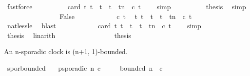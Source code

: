 \begin{isabellebody}
\ fastforce\isanewline
\ \ \ \ \ \ \ \ \isamarkupfalse%
\ {\isacartoucheopen}card\ {\isacharbraceleft}t{\isacharprime}{\isachardot}\ t\ {\isasymle}\ t{\isacharprime}\ {\isasymand}\ t{\isacharprime}\ {\isasymle}\ t{\isacharplus}n\ {\isasymand}\ c\ t{\isacharprime}{\isacharbraceright}\ {\isacharequal}\ {}{\isacartoucheclose}\ \isamarkupfalse%
\ simp\isanewline
\ \ \ \ \ \ \ \ \isamarkupfalse%
\ {\isacharquery}thesis\ \isamarkupfalse%
\ simp\isanewline
\ \ \ \ \ \ \isamarkupfalse%
\isanewline
\ \ \ \ \ \ \ \ \isamarkupfalse%
\ False\isanewline
\ \ \ \ \ \ \ \ \ \ \isamarkupfalse%
\ {\isacartoucheopen}{\isasymnot}c\ t{\isacartoucheclose}\ \isamarkupfalse%
\ {\isacartoucheopen}{\isasymforall}t{\isacharprime}{\isachardot}\ t\ {\isasymle}\ t{\isacharprime}\ {\isasymand}\ t{\isacharprime}\ {\isasymle}\ t{\isacharplus}n\ {\isasymlongrightarrow}\ {\isasymnot}c\ t{\isacharprime}{\isacartoucheclose}\ \isanewline
\ \ \ \ \ \ \ \ \ \ \ \ \isamarkupfalse%
\ nat{\isacharunderscore}less{\isacharunderscore}le\ \isamarkupfalse%
\ blast\isanewline
\ \ \ \ \ \ \ \ \ \ \isamarkupfalse%
\ {\isacartoucheopen}card\ {\isacharbraceleft}t{\isacharprime}{\isachardot}\ t\ {\isasymle}\ t{\isacharprime}\ {\isasymand}\ t{\isacharprime}\ {\isasymle}\ t{\isacharplus}n\ {\isasymand}\ c\ t{\isacharprime}{\isacharbraceright}\ {\isacharequal}\ {}{\isacartoucheclose}\ \isamarkupfalse%
\ simp\isanewline
\ \ \ \ \ \ \ \ \ \ \isamarkupfalse%
\ {\isacharquery}thesis\ \isamarkupfalse%
\ linarith\isanewline
\ \ \ \ \ \ \isamarkupfalse%
\isanewline
\ \ \ \ \isamarkupfalse%
\isanewline
\ \ \isacommand{{\isacharbraceright}}\isamarkupfalse%
\ \isamarkupfalse%
\ {\isacharquery}thesis\ \isacommand{{\isachardot}{\isachardot}}\isamarkupfalse%
\isanewline
{}\isamarkupfalse%
%
\endisatagproof
{\isafoldproof}%
%
\isadelimproof
%
\endisadelimproof
%
\begin{isamarkuptext}%
An n-sporadic clock is (n+1, 1)-bounded.%
\end{isamarkuptext}\isamarkuptrue%
\isamarkupfalse%
\ spor{\isacharunderscore}bounded{\isacharcolon}\isanewline
\ \ \ {\isacartoucheopen}p{\isacharunderscore}sporadic\ n\ c{\isacartoucheclose}\isanewline
\ \ \ \ \ {\isacartoucheopen}bounded\ {\isacharparenleft}n{\isacharplus}{}{\isacharparenright}\ {}\ c{\isacartoucheclose}\isanewline

\end{isabellebody}
